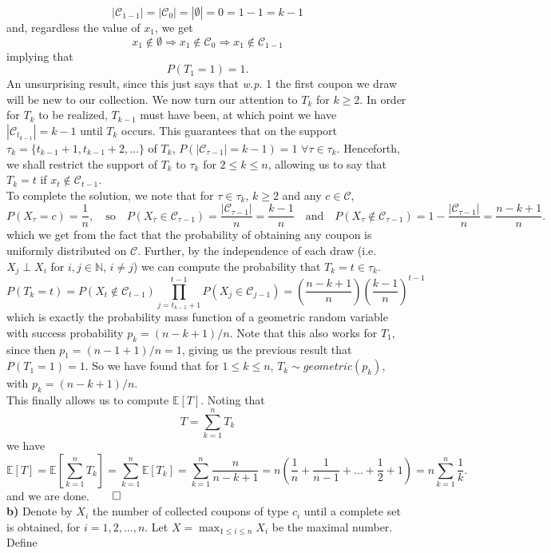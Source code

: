 \documentclass[11pt, letterpaper]{article}
\newcommand{\mbb}[1]{\mathbb{#1}}
\begin{document}
    \[|\mathcal{C}_{1-1}|=|\mathcal{C}_0|=|\emptyset|=0=1-1=k-1\]
    and, regardless the value of $x_1$, we get
    \[x_1\notin\emptyset\Rightarrow x_1\notin\mathcal{C}_0\Rightarrow x_1\notin\mathcal{C}_{1-1}\]
    implying that
    \[P(T_1=1)=1.\]
    An unsurprising result, since this just says that {\it w.p.} 1 the first coupon we draw will be new to our collection. We now turn our attention to $T_k$ for $k\geq 2$.
    In order for $T_k$ to be realized, $T_{k-1}$ must have been, at which point we have $|\mathcal{C}_{t_{k-1}}|=k-1$ until $T_k$ occurs.
    This guarantees that on the support $\tau_k=\{t_{k-1}+1,t_{k-1}+2,\dots\}$ of $T_k$, $P(|\mathcal{C}_{\tau-1}|=k-1)=1$ $\forall\tau\in\tau_k$. Henceforth, we shall restrict the support of $T_k$ to $\tau_k$ for $2\leq k\leq n$,
    allowing us to say that $T_k=t$ if $x_t\notin\mathcal{C}_{t-1}$.\\[10pt]
    To complete the solution, we note that for $\tau\in\tau_k$, $k\geq 2$ and any $c\in\mathcal{C}$,
    \[P(X_{\tau}=c)=\frac{1}{n},\quad\text{so}\quad P(X_\tau\in\mathcal{C}_{\tau-1})=\frac{|\mathcal{C}_{\tau-1}|}{n}=\frac{k-1}{n}\quad\text{and}\quad P(X_\tau\notin \mathcal{C}_{\tau-1})=1-\frac{|\mathcal{C}_{\tau-1}|}{n}=\frac{n-k+1}{n}.\]
    which we get from the fact that the probability of obtaining any coupon is uniformly distributed on $\mathcal{C}$. Further, by the independence of each draw (i.e. $X_j\perp X_i$ for $i,j\in\mathbb{N}$, $i\neq j$) we can compute the probability that $T_k=t\in\tau_k$.
    \[P(T_k=t)=P(X_t\notin\mathcal{C}_{t-1})\prod_{j=t_{k-1}+1}^{t-1}P(X_j\in\mathcal{C}_{j-1})=\left(\frac{n-k+1}{n}\right)\left(\frac{k-1}{n}\right)^{t-1}\] 
    which is exactly the probability mass function of a geometric random variable with success probability $p_k=(n-k+1)/n$. Note that this also works for $T_1$, since then
    $p_1=(n-1+1)/n=1$, giving us the previous result that $P(T_1=1)=1$. So we have found that for $1\leq k\leq n$, $T_k\sim geometric(p_k)$, with $p_k=(n-k+1)/n$.\\[10pt]
    This finally allows us to compute $\mbb{E}[T]$. Noting that
    \[T=\sum_{k=1}^nT_k\]
    we have
    \[\mbb{E}[T]=\mbb{E}\left[\sum_{k=1}^nT_k\right]=\sum_{k=1}^n\mbb{E}[T_k]=\sum_{k=1}^n\frac{n}{n-k+1}=n(\frac{1}{n}+\frac{1}{n-1}+\dots+\frac{1}{2}+1)=n\sum_{k=1}^n\frac{1}{k}.\]
    and we are done.\hfill{$\qed$}\\[10pt]
    {\bf b)} Denote by $X_i$ the number of collected coupons of type $c_i$ until a complete set is obtained, for $i=1,2,\dots,n$. Let $X=\max_{1\leq i\leq n}X_i$ be the maximal number. Define
\end{document}
